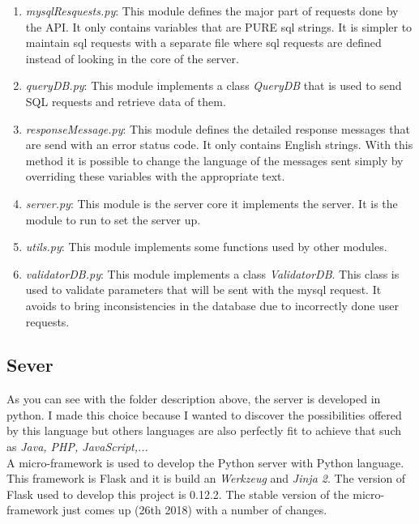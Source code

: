 
\begin{enumerate}
\item \textit{mysqlResquests.py}: This module defines the major part of requests done by the API. It only contains variables that are PURE sql strings. It is simpler to maintain sql requests with a separate file where sql requests are defined instead of looking in the core of the server.
\item \textit{queryDB.py}: This module implements a class \textit{QueryDB} that is used to send SQL requests and retrieve data of them.
\item \textit{responseMessage.py}: This module defines the detailed response messages that are send with an error status code. It only contains English strings. With this method it is possible to change the language of the messages sent simply by overriding these variables with the appropriate text.
\item \textit{server.py}: This module is the server core it implements the server. It is the module to run to set the server up.
\item \textit{utils.py}: This module implements some functions used by other modules. 
\item \textit{validatorDB.py}: This module implements a class \textit{ValidatorDB}. This class is used to validate parameters that will be sent with the mysql request. It avoids to bring inconsistencies in the database due to incorrectly done user requests.
\end{enumerate}
\subsection{Sever}
As you can see with the folder description above, the server is developed in python. I made this choice because I wanted to discover the possibilities offered by this language but others languages are also perfectly fit to achieve that such as \textit{Java, PHP, JavaScript,...}\\

A micro-framework is used to develop the Python server with Python language. This framework is Flask and it is build an \textit{Werkzeug} and \textit{Jinja 2}. The version of Flask used to develop this project is 0.12.2. The stable version of the micro-framework just comes up (26th 2018) with a number of changes. \\

